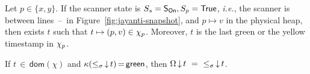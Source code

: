 \documentclass[a4paper,UKenglish]{lipics-v2016}
\newcommand{\ie}{\emph{i.e.}\xspace}
\newcommand{\dom}[1]{\mathsf{dom}(#1)}
\newcommand{\hist}{\chi}
\newcommand{\hpts}{\mapsto}
\newcommand{\ldot}{\mathord{.}\,}
\def\TT{\mathsf{True}}
\def\ordlist{\sigma}
\newcommand{\C}{\kappa}
\newcommand{\tleq}{\mathrel{\leq_\ordlist}}
\newcommand{\stableorder}{\Omega}
\newcommand{\sOn}{\mathsf{S_{On}}}
\theoremstyle{definition}
\begin{document}
\begin{lemma}\label{lemma:first-read}%
Let $p \in \{x, y\}$. If the scanner state is $\sss= \sOn, \spp =
\TT$, \ie, the scanner is between
lines~\lineScanReadsX--\lineScanReadsY\ in
Figure~\ref{fig:jayanti-snapshot}, and $ p \hpts v$ in the physical
heap, then exists $t$ such that $ t \hpts (p, v) \in
\histp$. Moreover, $t$
is the last green or the yellow timestamp in $\histp$.
\end{lemma}

\begin{lemma}[Chain]\label{lemma:complete-green}%
If $t\,{\in}\,\dom{\hist}$ and $\C(\ideal{{\tleq}}{t})\,{=}\,\mathsf{green}$, 
then
$\ideal{\stableorder}{t}\ =\ \ideal{{\tleq}}{t}$.
\end{lemma}

%


%

\end{document}
